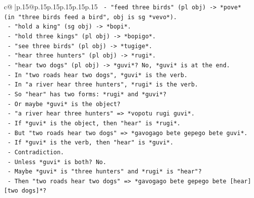 \documentclass{article}
\begin{document}
{\begin{supertabular}{c@{$\;$}|p{.15\linewidth}@{}p{.15\linewidth}p{.15\linewidth}p{.15\linewidth}p{.15\linewidth}p{.15\linewidth}}
{{{\texttt{                                           {-} "feed three birds" (pl obj) {-}> *pove* (in "three birds feed a bird", obj is sg *vevo*).} \\
\texttt{                                           {-} "hold a king" (sg obj) {-}> *bopi*.} \\
\texttt{                                           {-} "hold three kings" (pl obj) {-}> *bopigo*.} \\
\texttt{                                           {-} "see three birds" (pl obj) {-}> *tugige*.} \\
\texttt{                                           {-} "hear three hunters" (pl obj) {-}> *rugi*.} \\
\texttt{                                           {-} "hear two dogs" (pl obj) {-}> *guvi*? No, *guvi* is at the end.} \\
\texttt{                                           {-} In "two roads hear two dogs", *guvi* is the verb.} \\
\texttt{                                           {-} In "a river hear three hunters", *rugi* is the verb.} \\
\texttt{                                           {-} So "hear" has two forms: *rugi* and *guvi*?} \\
\texttt{                                           {-} Or maybe *guvi* is the object?} \\
\texttt{                                           {-} "a river hear three hunters" => *vopotu rugi guvi*.} \\
\texttt{                                             {-} If *guvi* is the object, then "hear" is *rugi*.} \\
\texttt{                                             {-} But "two roads hear two dogs" => *gavogago bete gepego bete guvi*.} \\
\texttt{                                               {-} If *guvi* is the verb, then "hear" is *guvi*.} \\
\texttt{                                               {-} Contradiction.} \\
\texttt{                                               {-} Unless *guvi* is both? No.} \\
\texttt{                                               {-} Maybe *guvi* is "three hunters" and *rugi* is "hear"?} \\
\texttt{                                               {-} Then "two roads hear two dogs" => *gavogago bete gepego bete {[}hear{]} {[}two dogs{]}*?} \\
}}}
\end{supertabular}}
\end{document}
